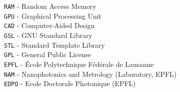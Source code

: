\documentclass[a4paper,11pt]{article}
\begin{document}
\texttt{RAM} - Random Access Memory\\
\texttt{GPU} - Graphical Processing Unit\\
\texttt{CAD} - Computer-Aided Design\\
\texttt{GSL} - GNU Standard Library\\
\texttt{STL} - Standard Template Library\\
\texttt{GPL} - General Public License\\
%
\texttt{EPFL} - \'Ecole Polytechnique F\'ed\'erale de Lausanne \\
\texttt{NAM} - Nanophotonics and Metrology (Laboratory, EPFL) \\
\texttt{EDPO} - Ecole Doctorale Photonique (EPFL)\\



\pagebreak
\vfill
\end{document}
